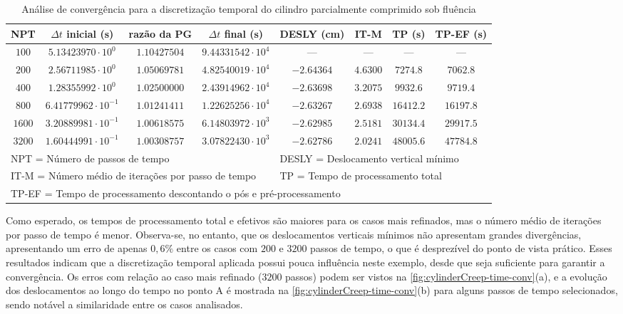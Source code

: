 \documentclass[Tese.tex]{subfiles}
\begin{document}
{\begin{table}[!h]
	\centering
	\scriptsize
	\caption{Análise de convergência para a discretização temporal do cilindro parcialmente comprimido sob fluência}
	\label{tab:convergence-dt}
	{\renewcommand{\arraystretch}{1.2}
		\begin{tabular}{cccccccc}
			\hline
			NPT & $\Delta t$ inicial (s) & razão da PG & $\Delta t$ final (s) & DESLY (cm) & IT-M & TP (s) & TP-EF (s) \\ \hline
			$100 $ & $5.13423970\cdot 10^{0}$ & $ 1.10427504$ & $9.44331542\cdot 10^{4}$ & --- & --- & --- & --- \\
			$200 $ & $2.56711985\cdot 10^{0}$ & $ 1.05069781$ & $4.82540019\cdot 10^{4}$ & $-2.64364$ & $4.6300$ & $   7274.8$ & $ 7062.8$ \\
			$400 $ & $1.28355992\cdot 10^{0}$ & $ 1.02500000$ & $2.43914962\cdot 10^{4}$ & $-2.63698$ & $3.2075$ & $   9932.6$ & $ 9719.4$ \\
			$800 $ & $6.41779962\cdot 10^{-1}$ & $ 1.01241411$ & $1.22625256\cdot 10^{4}$ & $-2.63267$ & $2.6938$ & $  16412.2$ & $16197.8$ \\
			$1600$ & $3.20889981\cdot 10^{-1}$ & $ 1.00618575$ & $6.14803972\cdot 10^{3}$ & $-2.62985$ & $2.5181$ & $  30134.4$ & $29917.5$ \\
			$3200$ & $1.60444991\cdot 10^{-1}$ & $ 1.00308757$ & $3.07822430\cdot 10^{3}$ & $-2.62786$ & $2.0241$ & $  48005.6$ & $47784.8$ \\ \hline
			\multicolumn{4}{l}{NPT = Número de passos de tempo} &  \multicolumn{4}{l}{DESLY = Deslocamento vertical mínimo}\\
			\multicolumn{4}{l}{IT-M = Número médio de iterações por passo de tempo} &  \multicolumn{4}{l}{TP = Tempo de processamento total}\\
			\multicolumn{7}{l}{TP-EF = Tempo de processamento descontando o pós e pré-processamento} \\
			\hline 
		\end{tabular}
	}
\end{table}

Como esperado, os tempos de processamento total e efetivos são maiores para os casos mais refinados, mas o número médio de iterações por passo de tempo é menor. Observa-se, no entanto, que os deslocamentos verticais mínimos não apresentam grandes divergências, apresentando um erro de apenas $0,6\%$ entre os casos com $200$ e $3200$ passos de tempo, o que é desprezível do ponto de vista prático. Esses resultados indicam que a discretização temporal aplicada possui pouca influência neste exemplo, desde que seja suficiente para garantir a convergência. Os erros com relação ao caso mais refinado ($3200$ passos) podem ser vistos na \cref{fig:cylinderCreep-time-conv}(a), e a evolução dos deslocamentos ao longo do tempo no ponto A é mostrada na \cref{fig:cylinderCreep-time-conv}(b) para alguns passos de tempo selecionados, sendo notável a similaridade entre os casos analisados.

}
\end{document}
